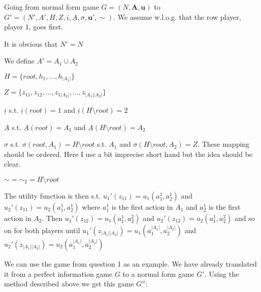 \documentclass[12pt]{article}
\newenvironment{answer}[2][Answer]{\begin{trivlist}
\item[\hskip \labelsep {\bfseries #1}\hskip \labelsep {\bfseries #2:}]}{\end{trivlist}}
\begin{document}
\begin{answer}{a)}

Going from normal form game $G=(N,\boldsymbol{A}, \boldsymbol{u})$ to $G'=(N', A', H, Z, \underline{i}, \underline{A}, \sigma, \boldsymbol{u'}, \sim)$. We assume w.l.o.g. that the row player, player 1, goes first.

\item It is obvious that $N'=N$
\item We define $A'=A_1 \cup A_2$
\item $H=\{root, h_1, ..., h_{|A_1|}\}$
\item $Z=\{z_{11}, z_{12}, ... , z_{1|A_2|}, ..., z_{|A_1||A_2|}\}$
\item $\underline{i}$ s.t. $\underline{i}(root)=1$ and $\underline{i}(H \setminus root)=2$
\item $\underline{A}$ s.t. $\underline{A}(root)=A_1$ and $\underline{A}(H \setminus root)=A_2$
\item $\sigma$ s.t. $\sigma(root, A_1)=H \setminus root$ s.t. $A_1$ and $\sigma(H \setminus root, A_2)=Z$. These mapping should be ordered. Here I use a bit imprecise short hand but the idea should be clear.
\item $\sim=\sim_2=H \setminus root$
\item The utility function is then s.t. $u_1'(z_{11})=u_1(a_1^1,a_2^1)$ and $u_2'(z_{11})=u_2(a_1^1,a_2^1)$ where $a_1^1$ is the first action in $A_1$ and $a_2^1$ is the first action in $A_2$. Then $u_1'(z_{12})=u_1(a_1^1,a_2^2)$ and $u_2'(z_{12})=u_2(a_1^1,a_2^2)$ and so on for both players until $u_1'(z_{|A_1||A_2|})=u_1(a_1^{|A_1|},a_2^{|A_2|})$ and $u_2'(z_{|A_1||A_2|})=u_2(a_1^{|A_1|},a_2^{|A_2|})$

We can use the game from question 1 as an example. We have already translated it from a perfect information game $G$ to a normal form game $G'$. Using the method described above we get this game $G''$: \\
\begin{center}
    \small
    \end{center}


\end{answer}
\end{document}
